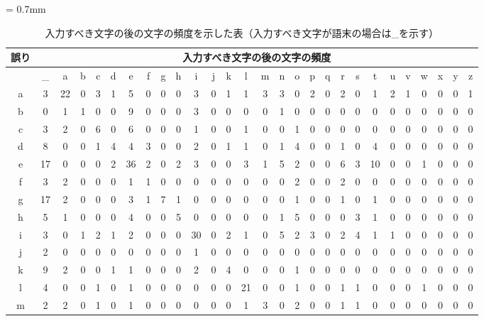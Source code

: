 {\tabcolsep = 0.7mm
 \begin{table*}[]
  \small
  \begin{center}
   \caption{入力すべき文字の後の文字の頻度を示した表（入力すべき文字が語末の場合は\_を示す）}
   \begin{tabular}{|c|c|c|c|c|c|c|c|c|c|c|c|c|c|c|c|c|c|c|c|c|c|c|c|c|c|c|c|} \hline
誤り & \multicolumn{27}{|c|}{入力すべき文字の後の文字の頻度} \\ \hline
 & \_ & a & b & c & d & e & f & g & h & i & j & k & l & m & n & o & p & q & r & s & t & u & v & w & x & y & z \\ \hline
a & 3 & 22 & 0 & 3 & 1 & 5 & 0 & 0 & 0 & 3 & 0 & 1 & 1 & 3 & 3 & 0 & 2 & 0 & 2 & 0 & 1 & 2 & 1 & 0 & 0 & 0 & 1 \\ \hline
b & 0 & 1 & 1 & 0 & 0 & 9 & 0 & 0 & 0 & 3 & 0 & 0 & 0 & 0 & 1 & 0 & 0 & 0 & 0 & 0 & 0 & 0 & 0 & 0 & 0 & 0 & 0 \\ \hline
c & 3 & 2 & 0 & 6 & 0 & 6 & 0 & 0 & 0 & 1 & 0 & 0 & 1 & 0 & 0 & 1 & 0 & 0 & 0 & 0 & 0 & 0 & 0 & 0 & 0 & 0 & 0 \\ \hline
d & 8 & 0 & 0 & 1 & 4 & 4 & 3 & 0 & 0 & 2 & 0 & 1 & 1 & 0 & 1 & 4 & 0 & 0 & 1 & 0 & 4 & 0 & 0 & 0 & 0 & 0 & 0 \\ \hline
e & 17 & 0 & 0 & 0 & 2 & 36 & 2 & 0 & 2 & 3 & 0 & 0 & 3 & 1 & 5 & 2 & 0 & 0 & 6 & 3 & 10 & 0 & 0 & 1 & 0 & 0 & 0 \\ \hline
f & 3 & 2 & 0 & 0 & 0 & 1 & 1 & 0 & 0 & 0 & 0 & 0 & 0 & 0 & 0 & 2 & 0 & 0 & 2 & 0 & 0 & 0 & 0 & 0 & 0 & 0 & 0 \\ \hline
g & 17 & 2 & 0 & 0 & 0 & 3 & 1 & 7 & 1 & 0 & 0 & 0 & 0 & 0 & 0 & 1 & 0 & 0 & 1 & 0 & 1 & 0 & 0 & 0 & 0 & 0 & 0 \\ \hline
h & 5 & 1 & 0 & 0 & 0 & 4 & 0 & 0 & 5 & 0 & 0 & 0 & 0 & 0 & 1 & 5 & 0 & 0 & 0 & 3 & 1 & 0 & 0 & 0 & 0 & 0 & 0 \\ \hline
i & 3 & 0 & 1 & 2 & 1 & 2 & 0 & 0 & 0 & 30 & 0 & 2 & 1 & 0 & 5 & 2 & 3 & 0 & 2 & 4 & 1 & 1 & 0 & 0 & 0 & 0 & 0 \\ \hline
j & 2 & 0 & 0 & 0 & 0 & 0 & 0 & 0 & 0 & 1 & 0 & 0 & 0 & 0 & 0 & 0 & 0 & 0 & 0 & 0 & 0 & 0 & 0 & 0 & 0 & 0 & 0 \\ \hline
k & 9 & 2 & 0 & 0 & 1 & 1 & 0 & 0 & 0 & 2 & 0 & 4 & 0 & 0 & 0 & 1 & 0 & 0 & 0 & 0 & 0 & 0 & 0 & 0 & 0 & 0 & 0 \\ \hline
l & 4 & 0 & 0 & 1 & 0 & 1 & 0 & 0 & 0 & 0 & 0 & 0 & 21 & 0 & 0 & 1 & 0 & 0 & 1 & 1 & 0 & 0 & 0 & 1 & 0 & 0 & 0 \\ \hline
m & 2 & 2 & 0 & 1 & 0 & 1 & 0 & 0 & 0 & 0 & 0 & 0 & 1 & 3 & 0 & 2 & 0 & 0 & 1 & 1 & 0 & 0 & 0 & 0 & 0 & 0 & 0 \\ \hline

\end{tabular}
\end{center}
\end{table*}}
